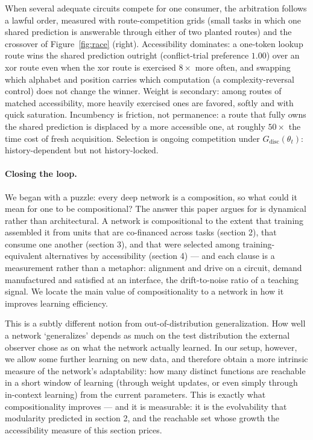 \documentclass[10pt]{article}
\theoremstyle{definition}
\begin{document}
When several adequate circuits compete for one consumer, the arbitration follows a lawful order, measured with route-competition grids (small tasks in which one shared prediction is answerable through either of two planted routes) and the crossover of Figure~\ref{fig:race} (right). Accessibility dominates: a one-token lookup route wins the shared prediction outright (conflict-trial preference $1.00$) over an xor route even when the xor route is exercised $8\times$ more often, and swapping which alphabet and position carries which computation (a complexity-reversal control) does not change the winner. Weight is secondary: among routes of matched accessibility, more heavily exercised ones are favored, softly and with quick saturation. Incumbency is friction, not permanence: a route that fully owns the shared prediction is displaced by a more accessible one, at roughly $50\times$ the time cost of fresh acquisition. Selection is ongoing competition under $G_{\mathrm{disc}}(\theta_t)$: history-dependent but not history-locked.

\paragraph{Closing the loop.} We began with a puzzle: every deep network is a composition, so what could it mean for one to be compositional? The answer this paper argues for is dynamical rather than architectural. A network is compositional to the extent that training assembled it from units that are co-financed across tasks (section 2), that consume one another (section 3), and that were selected among training-equivalent alternatives by accessibility (section 4) --- and each clause is a measurement rather than a metaphor: alignment and drive on a circuit, demand manufactured and satisfied at an interface, the drift-to-noise ratio of a teaching signal. We locate the main value of compositionality to a network in how it improves learning efficiency.

This is a subtly different notion from out-of-distribution generalization. How well a network `generalizes' depends as much on the test distribution the external observer chose as on what the network actually learned. In our setup, however, we allow some further learning on new data, and therefore obtain a more intrinsic measure of the network's adaptability: how many distinct functions are reachable in a short window of learning (through weight updates, or even simply through in-context learning) from the current parameters. This is exactly what compositionality improves --- and it is measurable: it is the evolvability that modularity predicted in section 2, and the reachable set whose growth the accessibility measure of this section prices.
\end{document}
